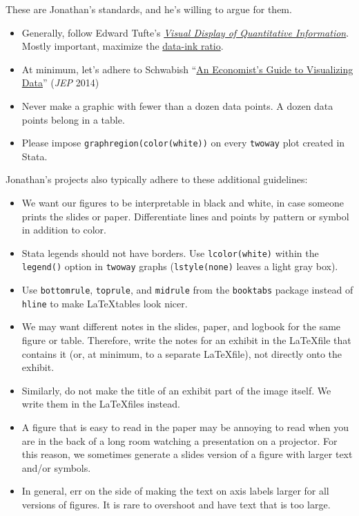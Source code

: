 These are Jonathan's standards, and he's willing to argue for them.

\begin{itemize}
	\item Generally, follow Edward Tufte's \href{https://www.edwardtufte.com/tufte/books_vdqi}{\textit{Visual Display of Quantitative Information}}.
	Mostly important, maximize the \href{https://www.coursera.org/learn/python-plotting/lecture/qFnP9/graphical-heuristics-data-ink-ratio-edward-tufte}{data-ink ratio}.
	\item At minimum, let's adhere to Schwabish ``\href{https://www.aeaweb.org/articles?id=10.1257/jep.28.1.209}{An Economist's Guide to Visualizing Data}'' (\textit{JEP} 2014)
	\item Never make a graphic with fewer than a dozen data points. A dozen data points belong in a table.
	\item Please impose \texttt{graphregion(color(white))} on every \texttt{twoway} plot created in Stata.
\end{itemize}

Jonathan's projects also typically adhere to these additional guidelines:
\begin{itemize}
\item
We want our figures to be interpretable in black and white, in case
someone prints the slides or paper.
Differentiate lines and points by pattern or symbol in addition to color.
\item
Stata legends should not have borders.
Use \texttt{lcolor(white)} within the \texttt{legend()} option in \texttt{twoway} graphs
(\texttt{lstyle(none)} leaves a light gray box).
\item
Use \texttt{bottomrule}, \texttt{toprule}, and \texttt{midrule} from the \texttt{booktabs} package
instead of \texttt{hline} to make \LaTeX\:tables look nicer.
\item
We may want different notes in the slides, paper, and logbook for the same figure or table.
Therefore, write the notes for an exhibit in the \LaTeX\:file that contains it
(or, at minimum, to a separate \LaTeX\:file), not directly onto the exhibit.
\item
Similarly, do not make the title of an exhibit part of the image itself.
We write them in the \LaTeX\:files instead.
\item
A figure that is easy to read in the paper may be annoying to read
when you are in the back of a long room watching a presentation on a projector.
For this reason, we sometimes generate a slides version of a figure with larger text and/or symbols.
\item
In general, err on the side of making the text on axis labels larger for all versions of figures.
It is rare to overshoot and have text that is too large.
\end{itemize}
